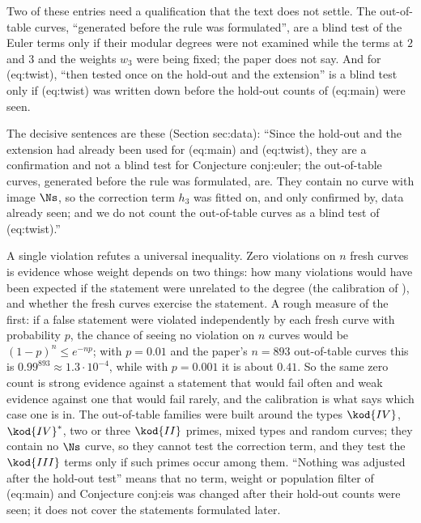 \begin{sloppypar}
\begin{remark}
\begin{center}
\begin{tabular}{p{2.6cm}p{2.1cm}p{2.3cm}p{1.7cm}p{4.6cm}}
\bottomrule
\end{tabular}
\end{center}
Two of these entries need a qualification that the text does not settle. The out-of-table curves, ``generated before the rule was formulated'',
are a blind test of the Euler terms only if their modular degrees were not examined while the terms at $2$ and $3$ and the weights $w_3$ were
being fixed; the paper does not say. And for (eq:twist), ``then tested once on the hold-out and the extension'' is a blind test only if
(eq:twist) was written down before the hold-out counts of (eq:main) were seen.
\end{remark}

The decisive sentences are these (Section sec:data): ``Since the hold-out and the extension had already been used for (eq:main) and (eq:twist),
they are a confirmation and not a blind test for Conjecture conj:euler; the out-of-table curves, generated before the rule was formulated, are.
They contain no curve with image $\Ns$, so the correction term $h_3$ was fitted on, and only confirmed by, data already seen; and we do not count
the out-of-table curves as a blind test of (eq:twist).''

\begin{remark}\label{rem:computation:what-is-tested}
A single violation refutes a universal inequality. Zero violations on $n$ fresh curves is evidence whose weight depends on two things: how many
violations would have been expected if the statement were unrelated to the degree (the calibration of ), and
whether the fresh curves exercise the statement. A rough measure of the first: if a false statement were violated independently by each fresh
curve with probability $p$, the chance of seeing no violation on $n$ curves would be $(1-p)^n\le e^{-np}$; with $p=0.01$ and the paper's $n=893$
out-of-table curves this is $0.99^{893}\approx1.3\cdot10^{-4}$, while with $p=0.001$ it is about $0.41$. So the same zero count is strong evidence
against a statement that would fail often and weak evidence against one that would fail rarely, and the calibration is what says which case one
is in. The out-of-table families were built around the types $\kod{IV}$, $\kod{IV}^*$, two or three $\kod{II}$ primes,
mixed types and random curves; they contain no $\Ns$ curve, so they cannot test the correction term, and they test the $\kod{III}$ terms only if such
primes occur among them. ``Nothing was adjusted after the hold-out test'' means that no term, weight or population filter of (eq:main) and
Conjecture conj:eis was changed after their hold-out counts were seen; it does not cover the statements formulated later.
\end{remark}


\end{sloppypar}
